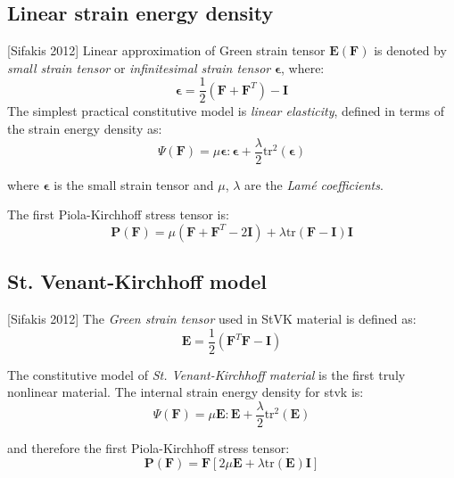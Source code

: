 \documentclass[10pt,a4paper]{article}
\begin{document}
\subsection{Linear strain energy density}
[Sifakis 2012] Linear approximation of Green strain tensor $ \mathbf{E}(\mathbf{F}) $ is denoted by \textit{small strain tensor} or \textit{infinitesimal strain tensor} $ \mathbf{\epsilon} $, where:
\begin{equation}
\mathbf{\epsilon}=\dfrac{1}{2} (\mathbf{F} + \mathbf{F}^T) - \mathbf{I}
\end{equation}
The simplest practical constitutive model is \textit{linear elasticity}, defined in terms of the strain energy density as:
\begin{equation}
\Psi(\mathbf{F}) = \mu \mathbf{\epsilon} : \mathbf{\epsilon} + \dfrac{\lambda}{2} \mathrm{tr}^2(\mathbf{\epsilon})
\end{equation}

where $ \mathbf{\epsilon} $ is the small strain tensor and $ \mu $, $ \lambda $ are the \textit{Lam\'{e} coefficients}.

The first Piola-Kirchhoff stress tensor is:
\begin{equation}
\mathbf{P}(\mathbf{F}) = \mu (\mathbf{F}+\mathbf{F}^T-2\mathbf{I}) + \lambda \mathrm{tr}(\mathbf{F}-\mathbf{I})\mathbf{I}
\end{equation}

\subsection{St. Venant-Kirchhoff model}
[Sifakis 2012] The \textit{Green strain tensor} used in StVK material is defined as:
\begin{equation}
\mathbf{E} = \dfrac{1}{2} \left( \mathbf{F}^T \mathbf{F} - \mathbf{I} \right)
\end{equation}

The constitutive model of \textit{St. Venant-Kirchhoff material} is the first truly nonlinear material. The internal strain energy density for stvk is:
\begin{equation}
\Psi (\mathbf{F}) = \mu \mathbf{E}:\mathbf{E} + \dfrac{\lambda}{2} \mathrm{tr}^2(\mathbf{E})
\end{equation}

and therefore the first Piola-Kirchhoff stress tensor:
\begin{equation}
\mathbf{P}(\mathbf{F}) = \mathbf{F}[2\mu \mathbf{E} + \lambda \mathrm{tr}(\mathbf{E})\mathbf{I} ]
\end{equation}
\end{document}
